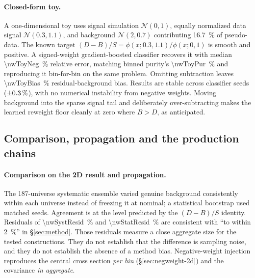 \paragraph{Closed-form toy.} A one-dimensional toy uses signal simulation $\mathcal{N}(0,1)$, equally normalized data signal $\mathcal{N}(0.3,1.1)$, and background $\mathcal{N}(2,0.7)$ contributing \SI{16.7}{\percent} of pseudo-data. The known target $(D-B)/S=\phi(x;0.3,1.1)/\phi(x;0,1)$ is smooth and positive. A signed-weight gradient-boosted classifier recovers it with median \SI{\nwToyNeg}{\percent} relative error, matching binned purity's \SI{\nwToyPur}{\percent} and reproducing it bin-for-bin on the same problem. Omitting subtraction leaves \SI{\nwToyBias}{\percent} residual-background bias. Results are stable across classifier seeds ($\pm\SI{0.3}{\percent}$), with no numerical instability from negative weights. Moving background into the sparse signal tail and deliberately over-subtracting makes the learned reweight floor cleanly at zero where $B>D$, as anticipated.

\subsection{Comparison, propagation and the production chains}\label{recsec:negweight-comparison}

\paragraph{Comparison on the 2D result and propagation.} The 187-universe systematic ensemble varied genuine background consistently within each universe instead of freezing it at nominal; a statistical bootstrap used matched seeds. Agreement is at the level predicted by the $(D-B)/S$ identity. Residuals of \SI{\nwSystResid}{\percent} and \SI{\nwStatResid}{\percent} are consistent with ``to within \SI{2}{\percent}'' in \S\ref{sec:method}. Those residuals measure a close aggregate size for the tested constructions. They do not establish that the difference is sampling noise, and they do not establish the absence of a method bias. Negative-weight injection reproduces the central cross section \emph{per bin} (\S\ref{sec:negweight-2d}) and the covariance \emph{in aggregate}.


